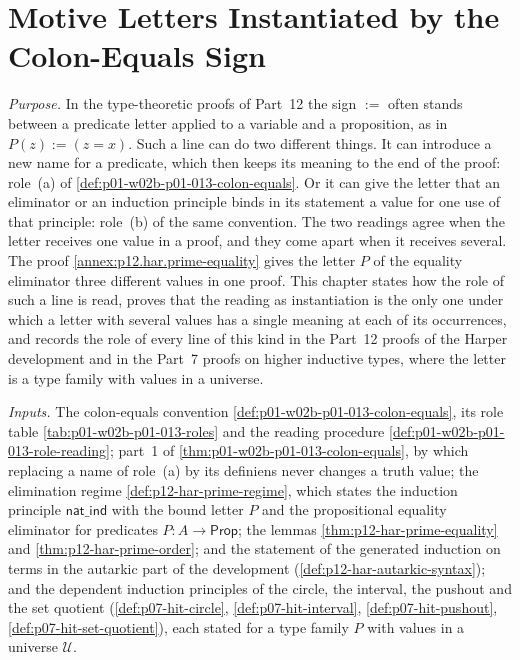 \chapter{Motive Letters Instantiated by the Colon-Equals Sign}
\label{sec:p01-w02c-p01-018-motives}

\emph{Purpose.}  In the type-theoretic proofs of Part~12 the sign \(:=\)
often stands between a predicate letter applied to a variable and a
proposition, as in \(P(z):=(z=x)\).  Such a line can do two different
things.  It can introduce a new name for a predicate, which then keeps its
meaning to the end of the proof: role~(a) of
\cref{def:p01-w02b-p01-013-colon-equals}.  Or it can give the letter
that an eliminator or an induction principle binds in its statement a
value for one use of that principle: role~(b) of the same convention.
The two readings agree when the letter receives one value in a proof, and
they come apart when it receives several.  The proof
\cref{annex:p12.har.prime-equality} gives the letter \(P\) of the
equality eliminator three different values in one proof.  This chapter
states how the role of such a line is read, proves that the reading as
instantiation is the only one under which a letter with several values
has a single meaning at each of its occurrences, and records the role of
every line of this kind in the Part~12 proofs of the Harper development and
in the Part~7 proofs on higher inductive types, where the letter is a type
family with values in a universe.

\emph{Inputs.}  The colon-equals convention
\cref{def:p01-w02b-p01-013-colon-equals}, its role table
\cref{tab:p01-w02b-p01-013-roles} and the reading procedure
\cref{def:p01-w02b-p01-013-role-reading}; part~1 of
\cref{thm:p01-w02b-p01-013-colon-equals}, by which replacing a name of
role~(a) by its definiens never changes a truth value; the elimination
regime \cref{def:p12-har-prime-regime}, which states the induction
principle \(\mathsf{nat\_ind}\) with the bound letter \(P\) and the
propositional equality eliminator for predicates \(P:A\to\mathsf{Prop}\);
the lemmas \cref{thm:p12-har-prime-equality} and
\cref{thm:p12-har-prime-order}; and the statement of the generated
induction on terms in the autarkic part of the development
(\cref{def:p12-har-autarkic-syntax}); and the dependent induction
principles of the circle, the interval, the pushout and the set quotient
(\cref{def:p07-hit-circle}, \cref{def:p07-hit-interval},
\cref{def:p07-hit-pushout}, \cref{def:p07-hit-set-quotient}), each stated
for a type family \(P\) with values in a universe \(\mathcal U\).

